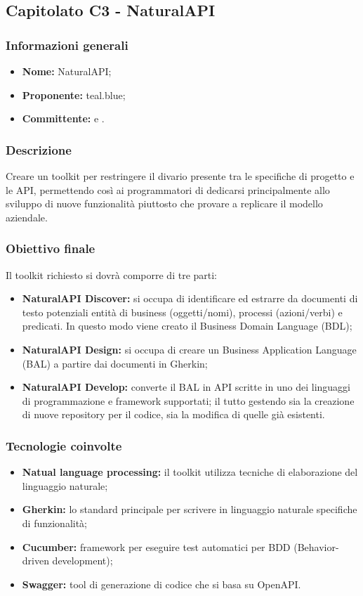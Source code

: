 \subsection{Capitolato C3 - NaturalAPI}

\subsubsection{Informazioni generali}
	\begin{itemize}
		\item \textbf{Nome:} NaturalAPI; 
		\item \textbf{Proponente:} teal.blue;
		\item \textbf{Committente:} \TV{} e \RC{}. 
	\end{itemize}

\subsubsection{Descrizione}
Creare un toolkit per restringere il divario presente tra le specifiche di progetto e le API, permettendo così ai programmatori di dedicarsi principalmente allo sviluppo di nuove funzionalità 
piuttosto che provare a replicare il modello aziendale. 

\subsubsection{Obiettivo finale}
Il toolkit richiesto si dovrà comporre di tre parti: 
\begin{itemize}
	\item \textbf{NaturalAPI Discover:} si occupa di identificare ed estrarre da documenti di testo potenziali entità di business (oggetti/nomi), processi (azioni/verbi)
	e predicati. In questo modo viene creato il Business Domain Language (BDL);  
	\item \textbf{NaturalAPI Design:} si occupa di creare un Business Application Language (BAL) a partire dai documenti in Gherkin; 
	\item \textbf{NaturalAPI Develop:} converte il BAL in API scritte in uno dei linguaggi di programmazione e framework supportati; il tutto gestendo sia la creazione di nuove repository per il codice, sia la modifica di quelle già esistenti. 
\end{itemize}

\subsubsection{Tecnologie coinvolte}
	\begin{itemize}
		\item \textbf{Natual language processing:} il toolkit utilizza tecniche di elaborazione del linguaggio naturale; 
		\item \textbf{Gherkin:} lo standard principale per scrivere in linguaggio naturale specifiche di funzionalità; 
		\item \textbf{Cucumber:} framework per eseguire test automatici per BDD 
		(Behavior-driven development); 
		\item \textbf{Swagger:} tool di generazione di codice che si basa su OpenAPI. 
	\end{itemize}

